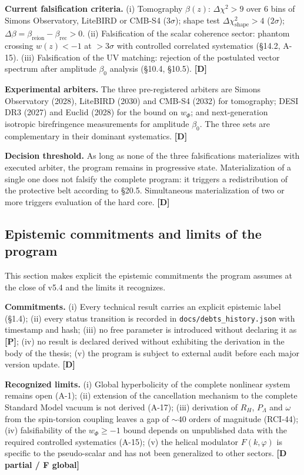 ﻿\documentclass[11pt,letterpaper]{article}
\begin{document}
\textbf{Current falsification criteria.} (i) Tomography $\beta(z)$: $\Delta \chi^2 > 9$ over 6 bins of Simons Observatory, LiteBIRD or CMB-S4 ($3\sigma$); shape test $\Delta \chi^2_{\text{shape}} > 4$ ($2\sigma$); $\Delta\beta = \beta_{\text{reion}} - \beta_{\text{rec}} > 0$. (ii) Falsification of the scalar coherence sector: phantom crossing $w(z) < -1$ at $> 3\sigma$ with controlled correlated systematics (§14.2, A-15). (iii) Falsification of the UV matching: rejection of the postulated vector spectrum after amplitude $\beta_0$ analysis (§10.4, §10.5). \textbf{[D]}

\textbf{Experimental arbiters.} The three pre-registered arbiters are Simons Observatory (2028), LiteBIRD (2030) and CMB-S4 (2032) for tomography; DESI DR3 (2027) and Euclid (2028) for the bound on $w_\Phi$; and next-generation isotropic birefringence measurements for amplitude $\beta_0$. The three sets are complementary in their dominant systematics. \textbf{[D]}

\textbf{Decision threshold.} As long as none of the three falsifications materializes with executed arbiter, the program remains in progressive state. Materialization of a single one does not falsify the complete program: it triggers a redistribution of the protective belt according to §20.5. Simultaneous materialization of two or more triggers evaluation of the hard core. \textbf{[D]}
\subsection{Epistemic commitments and limits of the program}
This section makes explicit the epistemic commitments the program assumes at the close of v5.4 and the limits it recognizes.

\textbf{Commitments.} (i) Every technical result carries an explicit epistemic label (§1.4); (ii) every status transition is recorded in \texttt{docs/debts\_history.json} with timestamp and hash; (iii) no free parameter is introduced without declaring it as \textbf{[P]}; (iv) no result is declared derived without exhibiting the derivation in the body of the thesis; (v) the program is subject to external audit before each major version update. \textbf{[D]}

\textbf{Recognized limits.} (i) Global hyperbolicity of the complete nonlinear system remains open (A-1); (ii) extension of the cancellation mechanism to the complete Standard Model vacuum is not derived (A-17); (iii) derivation of $R_H$, $P_\Lambda$ and $\omega$ from the spin-torsion coupling leaves a gap of $\sim 40$ orders of magnitude (RCI-44); (iv) falsifiability of the $w_\Phi \geq -1$ bound depends on unpublished data with the required controlled systematics (A-15); (v) the helical modulator $F(k, \varphi)$ is specific to the pseudo-scalar and has not been generalized to other sectors. \textbf{[D partial / F global]}
\end{document}
